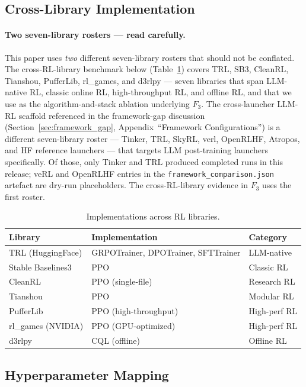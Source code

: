 \documentclass{article}
\begin{document}
\subsection{Cross-Library Implementation}

\paragraph{Two seven-library rosters --- read carefully.}
This paper uses \emph{two} different seven-library rosters that
should not be conflated. The cross-RL-library benchmark below
(Table~\ref{tab:implementations}) covers TRL, SB3, CleanRL, Tianshou,
PufferLib, rl\_games, and d3rlpy --- seven libraries that span
LLM-native RL, classic online RL, high-throughput RL, and offline RL,
and that we use as the algorithm-and-stack ablation underlying $F_3$.
The cross-launcher LLM-RL scaffold referenced in the framework-gap
discussion (Section~\ref{sec:framework_gap},
Appendix~``Framework Configurations'') is a different seven-library
roster --- Tinker, TRL, SkyRL, verl, OpenRLHF, Atropos, and HF
reference launchers --- that targets LLM post-training launchers
specifically. Of those, only Tinker and TRL produced completed
runs in this release; veRL and OpenRLHF entries in the
\texttt{framework\_comparison.json} artefact are dry-run
placeholders. The cross-RL-library evidence in $F_3$ uses the first
roster.

\begin{table}[htbp]
\centering
\caption{Implementations across RL libraries.}
\label{tab:implementations}
\begin{tabular}{lll}
\toprule
\textbf{Library} & \textbf{Implementation} & \textbf{Category} \\
\midrule
TRL (HuggingFace) & GRPOTrainer, DPOTrainer, SFTTrainer & LLM-native \\
Stable Baselines3 & PPO & Classic RL \\
CleanRL & PPO (single-file) & Research RL \\
Tianshou & PPO & Modular RL \\
PufferLib & PPO (high-throughput) & High-perf RL \\
rl\_games (NVIDIA) & PPO (GPU-optimized) & High-perf RL \\
d3rlpy & CQL (offline) & Offline RL \\
\bottomrule
\end{tabular}
\end{table}

\subsection{Hyperparameter Mapping}
\end{document}

